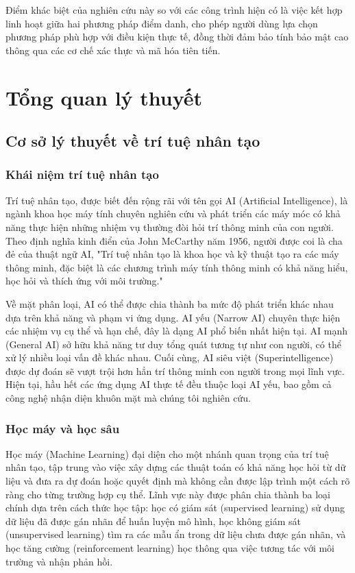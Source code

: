 \documentclass[12pt,a4paper]{report}
\begin{document}
Điểm khác biệt của nghiên cứu này so với các công trình hiện có là việc kết hợp linh hoạt giữa hai phương pháp điểm danh, cho phép người dùng lựa chọn phương pháp phù hợp với điều kiện thực tế, đồng thời đảm bảo tính bảo mật cao thông qua các cơ chế xác thực và mã hóa tiên tiến.

\chapter{Tổng quan lý thuyết}
\section{Cơ sở lý thuyết về trí tuệ nhân tạo}
\subsection{Khái niệm trí tuệ nhân tạo}
Trí tuệ nhân tạo, được biết đến rộng rãi với tên gọi AI (Artificial Intelligence), là ngành khoa học máy tính chuyên nghiên cứu và phát triển các máy móc có khả năng thực hiện những nhiệm vụ thường đòi hỏi trí thông minh của con người. Theo định nghĩa kinh điển của John McCarthy năm 1956, người được coi là cha đẻ của thuật ngữ AI, "Trí tuệ nhân tạo là khoa học và kỹ thuật tạo ra các máy thông minh, đặc biệt là các chương trình máy tính thông minh có khả năng hiểu, học hỏi và thích ứng với môi trường."

Về mặt phân loại, AI có thể được chia thành ba mức độ phát triển khác nhau dựa trên khả năng và phạm vi ứng dụng. AI yếu (Narrow AI) chuyên thực hiện các nhiệm vụ cụ thể và hạn chế, đây là dạng AI phổ biến nhất hiện tại. AI mạnh (General AI) sở hữu khả năng tư duy tổng quát tương tự như con người, có thể xử lý nhiều loại vấn đề khác nhau. Cuối cùng, AI siêu việt (Superintelligence) được dự đoán sẽ vượt trội hơn hẳn trí thông minh con người trong mọi lĩnh vực. Hiện tại, hầu hết các ứng dụng AI thực tế đều thuộc loại AI yếu, bao gồm cả công nghệ nhận diện khuôn mặt mà chúng tôi nghiên cứu.

\subsection{Học máy và học sâu}
Học máy (Machine Learning) đại diện cho một nhánh quan trọng của trí tuệ nhân tạo, tập trung vào việc xây dựng các thuật toán có khả năng học hỏi từ dữ liệu và đưa ra dự đoán hoặc quyết định mà không cần được lập trình một cách rõ ràng cho từng trường hợp cụ thể. Lĩnh vực này được phân chia thành ba loại chính dựa trên cách thức học tập: học có giám sát (supervised learning) sử dụng dữ liệu đã được gán nhãn để huấn luyện mô hình, học không giám sát (unsupervised learning) tìm ra các mẫu ẩn trong dữ liệu chưa được gán nhãn, và học tăng cường (reinforcement learning) học thông qua việc tương tác với môi trường và nhận phản hồi.
\end{document}
